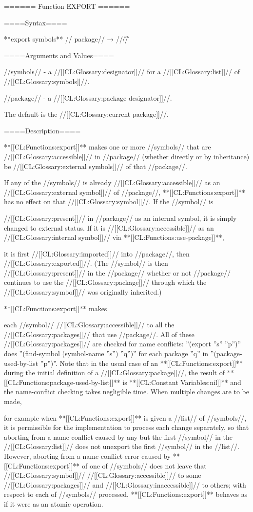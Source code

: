 ====== Function EXPORT ======

====Syntax====

**export {symbols** //\opt} package// → //\t//

====Arguments and Values====

//symbols// - a //[[CL:Glossary:designator]]// for a //[[CL:Glossary:list]]// of //[[CL:Glossary:symbols]]//.

//package// - a //[[CL:Glossary:package designator]]//.

The default is the //[[CL:Glossary:current package]]//.

====Description====

**[[CL:Functions:export]]** makes one or more //symbols// that are //[[CL:Glossary:accessible]]// in //package// (whether directly or by inheritance) be //[[CL:Glossary:external symbols]]// of that //package//.

If any of the //symbols// is already //[[CL:Glossary:accessible]]// as an //[[CL:Glossary:external symbol]]// of //package//, **[[CL:Functions:export]]** has no effect on that //[[CL:Glossary:symbol]]//. If the //symbol// is

//[[CL:Glossary:present]]// in //package// as an internal symbol, it is simply changed to external status. If it is //[[CL:Glossary:accessible]]// as an //[[CL:Glossary:internal symbol]]// via **[[CL:Functions:use-package]]**,

it is first //[[CL:Glossary:imported]]// into //package//, then //[[CL:Glossary:exported]]//. (The //symbol// is then //[[CL:Glossary:present]]// in the //package// whether or not //package// continues to use the //[[CL:Glossary:package]]// through which the //[[CL:Glossary:symbol]]// was originally inherited.)

**[[CL:Functions:export]]** makes

each //symbol// //[[CL:Glossary:accessible]]// to all the //[[CL:Glossary:packages]]// that use //package//. All of these //[[CL:Glossary:packages]]// are checked for name conflicts: ''(export ''s'' ''p'')'' does ''(find-symbol (symbol-name ''s'') ''q'')'' for each package ''q'' in ''(package-used-by-list ''p'')''. Note that in the usual case of an **[[CL:Functions:export]]** during the initial definition of a //[[CL:Glossary:package]]//, the result of **[[CL:Functions:package-used-by-list]]** is **[[CL:Constant Variables:nil]]** and the name-conflict checking takes negligible time. When multiple changes are to be made,

for example when **[[CL:Functions:export]]** is given a //list// of //symbols//, it is permissible for the implementation to process each change separately, so that aborting from a name conflict caused by any but the first //symbol// in the //[[CL:Glossary:list]]// does not unexport the first //symbol// in the //list//. However, aborting from a name-conflict error caused by **[[CL:Functions:export]]** of one of //symbols// does not leave that //[[CL:Glossary:symbol]]// //[[CL:Glossary:accessible]]// to some //[[CL:Glossary:packages]]// and //[[CL:Glossary:inaccessible]]// to others; with respect to each of //symbols// processed, **[[CL:Functions:export]]** behaves as if it were as an atomic operation.

